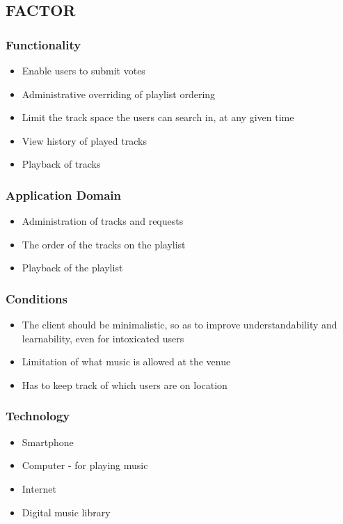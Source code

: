 \subsection{FACTOR}
\subsubsection{Functionality}
\begin{itemize}
    \item Enable users to submit votes
    \item Administrative overriding of playlist ordering
    \item Limit the track space the users can search in, at any given time
    \item View history of played tracks
    \item Playback of tracks
\end{itemize}

\subsubsection{Application Domain}
\begin{itemize}
    \item Administration of tracks and requests
    \item The order of the tracks on the playlist
    \item Playback of the playlist
\end{itemize}

\subsubsection{Conditions}
\begin{itemize}
    \item The client should be minimalistic, so as to improve understandability and learnability, even for intoxicated users
    \item Limitation of what music is allowed at the venue
    \item Has to keep track of which users are on location
\end{itemize}

\subsubsection{Technology}
\begin{itemize}
    \item Smartphone
    \item Computer - for playing music
    \item Internet
    \item Digital music library
\end{itemize}

